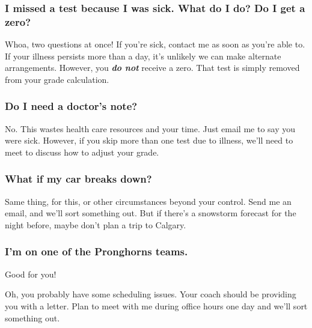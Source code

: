 \documentclass[10pt,]{article}
\newcommand{\alert}[1]{\textbf{\textit{#1}}}
\begin{document}
\subsubsection[{I missed a test because I was sick. What do I do? Do I get a zero?}]{I missed a test because I was sick. What do I do? Do I get a zero?}\label{subsubsection-24}
\hypertarget{p-33}{}%
Whoa, two questions at once! If you're sick, contact me as soon as you're able to. If your illness persists more than a day, it's unlikely we can make alternate arrangements. However, you \alert{do not} receive a zero. That test is simply removed from your grade calculation.%
%
%
\typeout{************************************************}
\typeout{************************************************}
%
\subsubsection[{Do I need a doctor's note?}]{Do I need a doctor's note?}\label{subsubsection-25}
\hypertarget{p-34}{}%
No. This wastes health care resources and your time. Just email me to say you were sick. However, if you skip more than one test due to illness, we'll need to meet to discuss how to adjust your grade.%
%
%
\typeout{************************************************}
\typeout{************************************************}
%
\subsubsection[{What if my car breaks down?}]{What if my car breaks down?}\label{subsubsection-26}
\hypertarget{p-35}{}%
Same thing, for this, or other circumstances beyond your control. Send me an email, and we'll sort something out. But if there's a snowstorm forecast for the night before, maybe don't plan a trip to Calgary.%
%
%
\typeout{************************************************}
\typeout{************************************************}
%
\subsubsection[{I'm on one of the Pronghorns teams.}]{I'm on one of the Pronghorns teams.}\label{subsubsection-27}
\hypertarget{p-36}{}%
Good for you!%
\par
\hypertarget{p-37}{}%
Oh, you probably have some scheduling issues. Your coach should be providing you with a letter. Plan to meet with me during office hours one day and we'll sort something out.%
%
%
\typeout{************************************************}
\typeout{************************************************}
%
\end{document}
